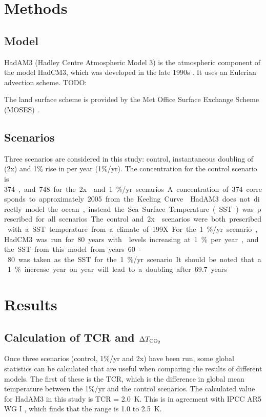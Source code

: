 \documentclass{article}
\begin{document}
\section{Methods}

\subsection{Model}

HadAM3 (Hadley Centre Atmospheric Model 3) is the atmospheric component of the model HadCM3, which was developed in the late 1990s \parencite{pope2000impact}. It uses an Eulerian advection scheme. TODO:

The land surface scheme is provided by the Met Office Surface Exchange Scheme (MOSES) \parencite{cox1999impact}.


\subsection{Scenarios}

Three scenarios are considered in this study: control, instantaneous doubling of  (2x) and 1\% rise in  per year (1\%/yr). The  concentration for the control scenario is \SI{374}, and \SI{748} for the 2x and 1\%/yr scenarios. A concentration of \SI{374} corresponds to approximately 2005 from the Keeling Curve \parencite{keeling1976atmospheric}. HadAM3 does not directly model the ocean, instead the Sea Surface Temperature (SST) was prescribed for all scenarios. The control and 2x scenarios were both prescribed with a SST temperature from a climate of 199X. For the 1\%/yr scenario, HadCM3 was run for \SI{80}{years} with  levels increasing at 1\% per year, and the SST from this model from years 60-80 was taken as the SST for the 1\%/yr scenario. It should be noted that a 1\% increase year on year will lead to a doubling after \SI{69.7}{years}.

\newpage
\section{Results}

\subsection{Calculation of TCR and $\Delta T_{\ce{CO2}}$}

Once three scenarios (control, 1\%/yr and 2x) have been run, some global statistics can be calculated that are useful when comparing the results of different models. The first of these is the TCR, which is the difference in global mean temperature between the 1\%/yr and the control scenarios. The calculated value for HadAM3 in this study is TCR = \SI{2.0}{K}. This is in agreement with IPCC AR5 WG I \parencite{ipcc2014wg1}, which finds that the range is 1.0 to \SI{2.5}{K}.
\end{document}
